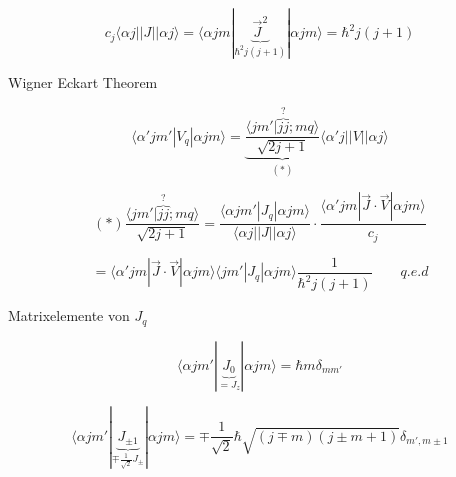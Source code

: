 \[ c_j\langle \alpha j||J||\alpha j\rangle = \langle \alpha jm|\underbrace{\vec J^2}_{\hbar^2 j(j+1)}|\alpha jm\rangle = \hbar^2j(j+1)\]


Wigner Eckart Theorem

\[\langle \alpha' jm'|V_q|\alpha jm\rangle = 
\underbrace{\frac{ \langle jm'| \overbrace{jj}^{?}; mq\rangle}{\sqrt{2j+1}}}_{(*)} \langle \alpha' j|| V || \alpha j\rangle
\]

\[ (*) \frac{ \langle jm'| \overbrace{jj}^{?}; mq\rangle}{\sqrt{2j+1}}
= \frac{ \langle \alpha jm'| J_q|\alpha jm\rangle}{\langle \alpha j||J|| \alpha j \rangle} \cdot 
\frac{ \langle \alpha' jm| \vec J \cdot \vec V|\alpha jm\rangle}{c_j}
\]

\[ =\langle \alpha' jm| \vec J \cdot \vec V|\alpha jm\rangle \langle jm'|J_q| \alpha jm\rangle \frac 1 {\hbar^2 j(j+1)} \qquad q.e.d\]

Matrixelemente von \(J_q\)

\[ \langle \alpha jm'| \underbrace{J_0}_{=J_z} |\alpha jm\rangle =\hbar m \delta_{mm'}\]

\[ \langle \alpha jm'| \underbrace{J_{\pm 1}}_{\mp\frac 1 {\sqrt2}J_\pm} |\alpha jm\rangle = \mp\frac 1 {\sqrt 2} \hbar
\sqrt{(j\mp m)(j\pm m+1)}\delta_{m',m\pm 1} 
\]






